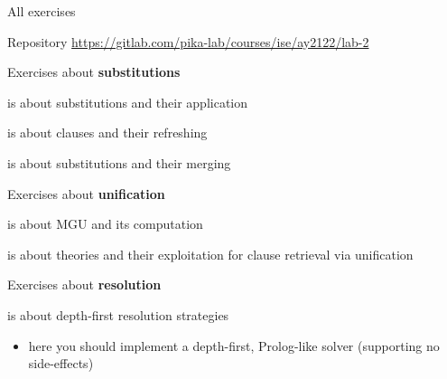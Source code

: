 \documentclass[presentation]{beamer}\mode<presentation>{\usetheme{AMSBolognaFC}}
\begin{document}
\begin{frame}[allowframebreaks]{All exercises}

    \begin{alertblock}{Repository}
        \centering
        \url{https://gitlab.com/pika-lab/courses/ise/ay2122/lab-2}
    \end{alertblock}

    \begin{block}{Exercises about \textbf{substitutions}}
        \label{slide:ex-sub}
        \begin{description}
            \startExercise
            \item[\currentExercise] is about substitutions and their application 
            \startExercise
            \item[\currentExercise] is about clauses and their refreshing
            \startExercise
            \item[\currentExercise] is about substitutions and their merging
        \end{description}
    \end{block}
    \begin{block}{Exercises about \textbf{unification}}
        \label{slide:ex-uni}
        \begin{description}
            \startExercise
            \item[\currentExercise] is about MGU and its computation
            \startExercise
            \item[\currentExercise] is about theories and their exploitation for clause retrieval via unification
        \end{description}
    \end{block}
    \begin{block}{Exercises about \textbf{resolution}}
        \label{slide:ex-res}
        \begin{description}
            \startExercise
            \item[\currentExercise] is about depth-first resolution strategies
            \begin{itemize}
                \item here you should implement a depth-first, Prolog-like solver (supporting no side-effects)
            \end{itemize} 


\end{description}
\end{block}
\end{frame}
\end{document}
